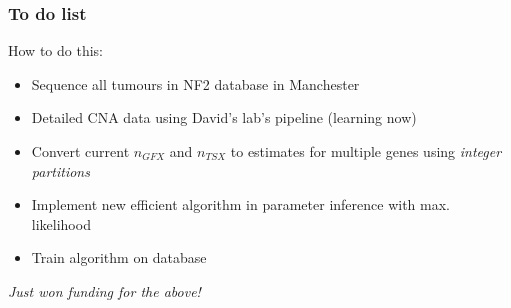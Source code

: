 \documentclass{beamer}
\begin{document}
\begin{frame}
    \frametitle{To do list}

    How to do this:
    \begin{itemize}
        \item Sequence all tumours in NF2 database in Manchester
        \item Detailed CNA data using David's lab's pipeline (learning now)
        \item Convert current $n_{GFX}$ and $n_{TSX}$ to estimates for multiple genes
        using \emph{integer partitions}
        \item Implement new efficient algorithm in parameter inference with max.
        likelihood 
        \item Train algorithm on database
    \end{itemize}

    \;

    \begin{center}
        \emph{Just won funding for the above!}
    \end{center}
\end{frame}


\end{document}
